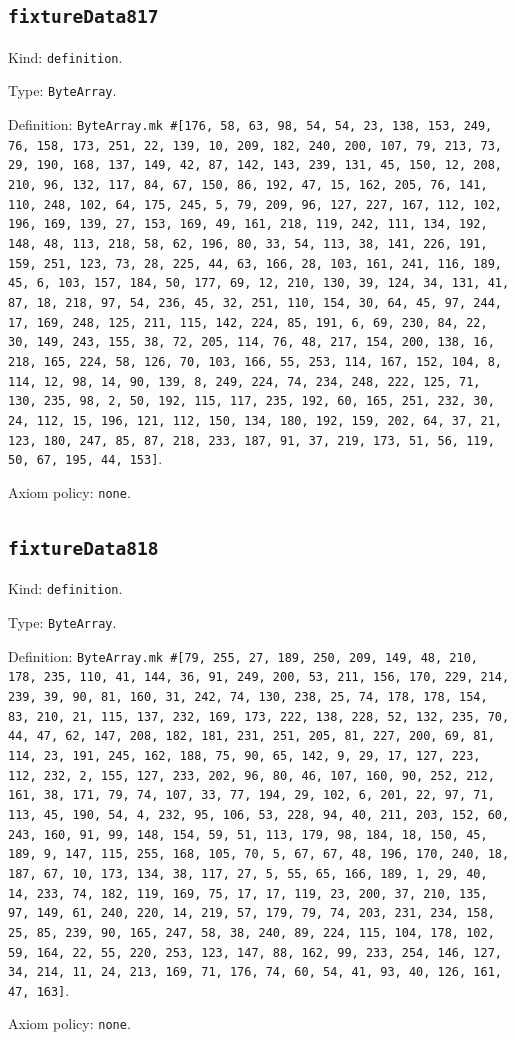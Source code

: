 \documentclass[11pt]{article}
\begin{document}
\subsection*{\texttt{fixtureData817}}
\noindent Kind: \texttt{definition}.\par
\noindent Type: \texttt{ByteArray}.\par
\noindent Definition: \texttt{ByteArray.mk \#[176, 58, 63, 98, 54, 54, 23, 138, 153, 249, 76, 158, 173, 251, 22, 139, 10, 209, 182, 240, 200, 107, 79, 213, 73, 29, 190, 168, 137, 149, 42, 87, 142, 143, 239, 131, 45, 150, 12, 208, 210, 96, 132, 117, 84, 67, 150, 86, 192, 47, 15, 162, 205, 76, 141, 110, 248, 102, 64, 175, 245, 5, 79, 209, 96, 127, 227, 167, 112, 102, 196, 169, 139, 27, 153, 169, 49, 161, 218, 119, 242, 111, 134, 192, 148, 48, 113, 218, 58, 62, 196, 80, 33, 54, 113, 38, 141, 226, 191, 159, 251, 123, 73, 28, 225, 44, 63, 166, 28, 103, 161, 241, 116, 189, 45, 6, 103, 157, 184, 50, 177, 69, 12, 210, 130, 39, 124, 34, 131, 41, 87, 18, 218, 97, 54, 236, 45, 32, 251, 110, 154, 30, 64, 45, 97, 244, 17, 169, 248, 125, 211, 115, 142, 224, 85, 191, 6, 69, 230, 84, 22, 30, 149, 243, 155, 38, 72, 205, 114, 76, 48, 217, 154, 200, 138, 16, 218, 165, 224, 58, 126, 70, 103, 166, 55, 253, 114, 167, 152, 104, 8, 114, 12, 98, 14, 90, 139, 8, 249, 224, 74, 234, 248, 222, 125, 71, 130, 235, 98, 2, 50, 192, 115, 117, 235, 192, 60, 165, 251, 232, 30, 24, 112, 15, 196, 121, 112, 150, 134, 180, 192, 159, 202, 64, 37, 21, 123, 180, 247, 85, 87, 218, 233, 187, 91, 37, 219, 173, 51, 56, 119, 50, 67, 195, 44, 153]}.\par
\noindent Axiom policy: \texttt{none}.\par
\subsection*{\texttt{fixtureData818}}
\noindent Kind: \texttt{definition}.\par
\noindent Type: \texttt{ByteArray}.\par
\noindent Definition: \texttt{ByteArray.mk \#[79, 255, 27, 189, 250, 209, 149, 48, 210, 178, 235, 110, 41, 144, 36, 91, 249, 200, 53, 211, 156, 170, 229, 214, 239, 39, 90, 81, 160, 31, 242, 74, 130, 238, 25, 74, 178, 178, 154, 83, 210, 21, 115, 137, 232, 169, 173, 222, 138, 228, 52, 132, 235, 70, 44, 47, 62, 147, 208, 182, 181, 231, 251, 205, 81, 227, 200, 69, 81, 114, 23, 191, 245, 162, 188, 75, 90, 65, 142, 9, 29, 17, 127, 223, 112, 232, 2, 155, 127, 233, 202, 96, 80, 46, 107, 160, 90, 252, 212, 161, 38, 171, 79, 74, 107, 33, 77, 194, 29, 102, 6, 201, 22, 97, 71, 113, 45, 190, 54, 4, 232, 95, 106, 53, 228, 94, 40, 211, 203, 152, 60, 243, 160, 91, 99, 148, 154, 59, 51, 113, 179, 98, 184, 18, 150, 45, 189, 9, 147, 115, 255, 168, 105, 70, 5, 67, 67, 48, 196, 170, 240, 18, 187, 67, 10, 173, 134, 38, 117, 27, 5, 55, 65, 166, 189, 1, 29, 40, 14, 233, 74, 182, 119, 169, 75, 17, 17, 119, 23, 200, 37, 210, 135, 97, 149, 61, 240, 220, 14, 219, 57, 179, 79, 74, 203, 231, 234, 158, 25, 85, 239, 90, 165, 247, 58, 38, 240, 89, 224, 115, 104, 178, 102, 59, 164, 22, 55, 220, 253, 123, 147, 88, 162, 99, 233, 254, 146, 127, 34, 214, 11, 24, 213, 169, 71, 176, 74, 60, 54, 41, 93, 40, 126, 161, 47, 163]}.\par
\noindent Axiom policy: \texttt{none}.\par
\end{document}
